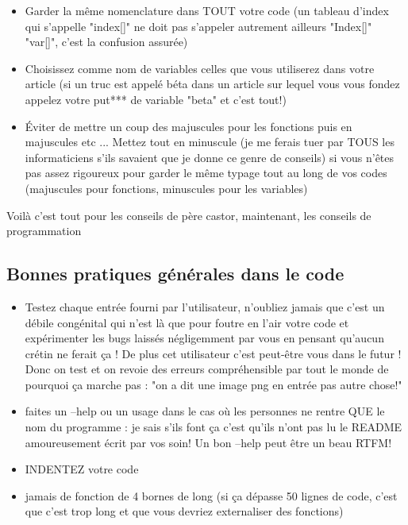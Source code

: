 \begin{itemize}
\item Garder la même nomenclature dans TOUT votre code (un tableau d'index qui s'appelle "index[]" 
ne doit pas s'appeler autrement ailleurs "Index[]" "var[]", c'est la confusion assurée)
\item Choisissez comme nom de variables celles que vous utiliserez dans votre article 
(si un truc est appelé béta dans un article sur lequel vous vous fondez appelez votre put*** 
de variable "beta" et c'est tout!)
\item Éviter de mettre un coup des majuscules pour les fonctions puis en majuscules etc ... 
Mettez tout en minuscule (je me ferais tuer par TOUS les informaticiens s'ils savaient que je 
donne ce genre de conseils) si vous n'êtes pas assez rigoureux pour garder le même typage tout 
au long de vos codes (majuscules pour fonctions, minuscules pour les variables)
\end{itemize}


Voilà c'est tout pour les conseils de père castor, maintenant, les conseils de programmation\\

\subsection{Bonnes pratiques générales dans le code}

\begin{itemize}
\item Testez chaque entrée fourni par l'utilisateur, n'oubliez jamais que c'est un débile congénital
 qui n'est là que pour foutre en l'air votre code et expérimenter les bugs laissés négligemment par 
vous en pensant qu'aucun crétin ne ferait ça ! De plus cet utilisateur c'est peut-être vous dans 
le futur ! Donc on test et on revoie des erreurs compréhensible par tout le monde de pourquoi ça 
marche pas : "on a dit une image png en entrée pas autre chose!"
\item faites un --help ou un usage dans le cas où les personnes ne rentre QUE le nom du programme : 
je sais s'ils font ça c'est qu'ils n'ont pas lu le README amoureusement écrit par vos soin! Un bon
 --help peut être un beau RTFM!
\item INDENTEZ votre code
\item jamais de fonction de 4 bornes de long (si ça dépasse 50 lignes de code, c'est que c'est trop
 long et que vous devriez externaliser des fonctions)
\end{itemize}

